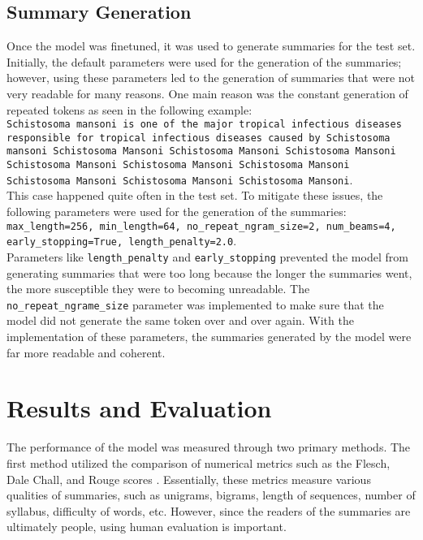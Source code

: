 \documentclass[11pt,a4paper]{article}
\begin{document}
\subsection{Summary Generation}
\indent \indent Once the model was finetuned, it was used to generate summaries for the test set. Initially, the default parameters were used for the generation of the summaries; however, using these parameters led to the generation of summaries that were not very readable for many reasons. One main reason was the constant generation of repeated tokens as seen in the following example: \\
\texttt{Schistosoma mansoni is one of the major tropical infectious diseases responsible for tropical infectious diseases caused by Schistosoma mansoni Schistosoma Mansoni Schistosoma Mansoni Schistosoma Mansoni Schistosoma Mansoni Schistosoma Mansoni Schistosoma Mansoni Schistosoma Mansoni Schistosoma Mansoni Schistosoma Mansoni}. \\
This case happened quite often in the test set. To mitigate these issues, the following parameters were used for the generation of the summaries: \\
\texttt{max\_length=256, min\_length=64, no\_repeat\_ngram\_size=2, num\_beams=4, early\_stopping=True, length\_penalty=2.0}. \\
Parameters like \texttt{length\_penalty} and \texttt{early\_stopping} prevented the model from generating summaries that were too long because the longer the summaries went, the more susceptible they were to becoming unreadable. The \texttt{no\_repeat\_ngrame\_size} parameter was implemented to make sure that the model did not generate the same token over and over again. With the implementation of these parameters, the summaries generated by the model were far more readable and coherent.


\section{Results and Evaluation}


\indent \indent The performance of the model was measured through two primary methods. The first method utilized the comparison of numerical metrics such as the Flesch, Dale Chall, and Rouge scores \cite{lin-2004-rouge}. Essentially, these metrics measure various qualities of summaries, such as unigrams, bigrams, length of sequences, number of syllabus, difficulty of words, etc. However, since the readers of the summaries are ultimately people, using human evaluation is important.
\end{document}
